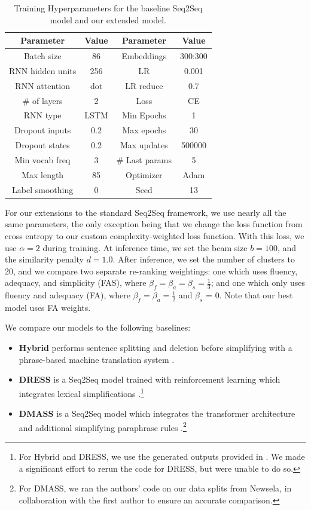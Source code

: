 \documentclass[thesis.tex]{subfiles}
\begin{document}
\begin{table}
\small
\begin{center}
\begin{tabular}{|c|c|c|c|} \hline
\textbf{Parameter} & \textbf{Value} & \textbf{Parameter} & \textbf{Value} \\ 
\hline
Batch size & 86 & Embeddings & 300:300\\
RNN hidden units & 256 & LR & 0.001\\
RNN attention & dot & LR reduce & 0.7\\
\# of layers & 2 & Loss & CE\\
RNN type & LSTM & Min Epochs & 1\\
Dropout inputs & 0.2 & Max epochs & 30\\
Dropout states & 0.2 & Max updates & 500000\\
Min vocab freq & 3 & \# Last params & 5\\
Max length & 85 & Optimizer & Adam\\
Label smoothing & 0 & Seed & 13\\
\hline
\end{tabular}
\end{center}
\caption{\label{tab:params} Training Hyperparameters for the baseline Seq2Seq model and our extended model.}
\end{table}

For our extensions to the standard Seq2Seq framework, we use nearly all the same parameters, the only exception being that we change the loss function from cross entropy to our custom complexity-weighted loss function. With this loss, we use $\alpha = 2$ during training. At inference time, we set the beam size $b = 100$, and the similarity penalty $d = 1.0$. After inference, we set the number of clusters to 20, and we compare two separate re-ranking weightings: one which uses fluency, adequacy, and simplicity (FAS), where $\beta_f = \beta_a = \beta_s = \frac{1}{3}$; and one which only uses fluency and adequacy (FA), where $\beta_f = \beta_a = \frac{1}{2}$ and $\beta_s$ = 0. Note that our best model uses FA weights.

We compare our models to the following baselines:

\begin{itemize}
    \item \textbf{Hybrid} performs sentence splitting and deletion before simplifying with a phrase-based machine translation system \citep{narayan2014hybrid}.
    \item \textbf{DRESS} is a Seq2Seq model trained with reinforcement learning which integrates lexical simplifications \citep{zhang2017sentence}.\footnote{For Hybrid and DRESS, we use the generated outputs provided in \cite{zhang2017sentence}. We made a significant effort to rerun the code for DRESS, but were unable to do so.}
    \item \textbf{DMASS} is a Seq2Seq model which integrates the transformer architecture and additional simplifying paraphrase rules \citep{zhao2018integrating}.\footnote{For DMASS, we ran the authors' code on our data splits from Newsela, in collaboration with the first author to ensure an accurate comparison.}
\end{itemize}
\end{document}
